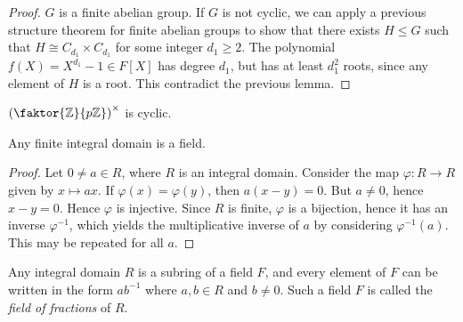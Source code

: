 \begin{proof}
	\( G \) is a finite abelian group.
	If \( G \) is not cyclic, we can apply a previous structure theorem for finite abelian groups to show that there exists \( H \leq G \) such that \( H \cong C_{d_1} \times C_{d_1} \) for some integer \( d_1 \geq 2 \).
	The polynomial \( f(X) = X^{d_1} - 1 \in F[X] \) has degree \( d_1 \), but has at least \( d_1^2 \) roots, since any element of \( H \) is a root.
	This contradict the previous lemma.
\end{proof}
\begin{example}
	\( \qty(\faktor{\mathbb Z}{p\mathbb Z})^\times \) is cyclic.
\end{example}
\begin{proposition}
	Any finite integral domain is a field.
\end{proposition}
\begin{proof}
	Let \( 0 \neq a \in R \), where \( R \) is an integral domain.
	Consider the map \( \varphi \colon R \to R \) given by \( x \mapsto ax \).
	If \( \varphi(x) = \varphi(y) \), then \( a(x-y) = 0 \).
	But \( a \neq 0 \), hence \( x - y = 0 \).
	Hence \( \varphi \) is injective.
	Since \( R \) is finite, \( \varphi \) is a bijection, hence it has an inverse \( \varphi^{-1} \), which yields the multiplicative inverse of \( a \) by considering \( \varphi^{-1}(a) \).
	This may be repeated for all \( a \).
\end{proof}
\begin{theorem}
	Any integral domain \( R \) is a subring of a field \( F \), and every element of \( F \) can be written in the form \( ab^{-1} \) where \( a, b \in R \) and \( b \neq 0 \).
	Such a field \( F \) is called the \textit{field of fractions} of \( R \).
\end{theorem}
